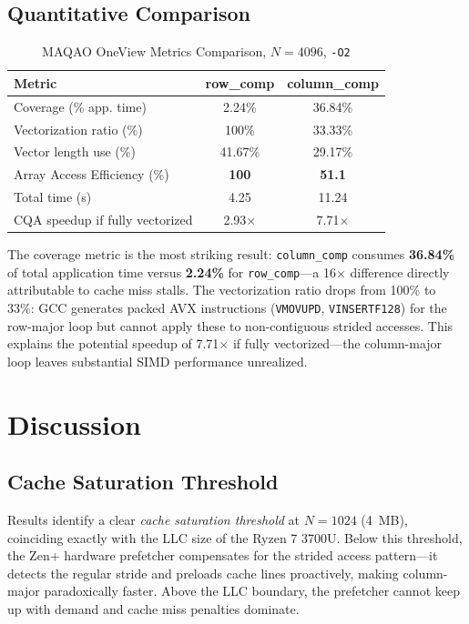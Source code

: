 \documentclass[conference]{IEEEtran}
\begin{document}
\subsection{Quantitative Comparison}

\begin{table}[H]
\caption{MAQAO OneView Metrics Comparison, $N = 4096$, \texttt{-O2}}
\label{tab:maqao}
\centering
\begin{tabular}{lcc}
\toprule
\textbf{Metric} & \textbf{row\_comp} & \textbf{column\_comp} \\
\midrule
Coverage (\% app. time)         & 2.24\%       & 36.84\%       \\
Vectorization ratio (\%)        & 100\%        & 33.33\%       \\
Vector length use (\%)          & 41.67\%      & 29.17\%       \\
Array Access Efficiency (\%)    & \textbf{100} & \textbf{51.1} \\
Total time (s)                  & 4.25         & 11.24         \\
CQA speedup if fully vectorized & 2.93$\times$ & 7.71$\times$  \\
\bottomrule
\end{tabular}
\end{table}

The coverage metric is the most striking result: \texttt{column\_comp} consumes
\textbf{36.84\%} of total application time versus \textbf{2.24\%} for
\texttt{row\_comp}---a 16$\times$ difference directly attributable to cache
miss stalls. The vectorization ratio drops from 100\% to 33\%: GCC generates
packed AVX instructions (\texttt{VMOVUPD}, \texttt{VINSERTF128}) for the
row-major loop but cannot apply these to non-contiguous strided accesses. This
explains the potential speedup of 7.71$\times$ if fully vectorized---the
column-major loop leaves substantial SIMD performance unrealized.

\section{Discussion}
\label{sec:discussion}

\subsection{Cache Saturation Threshold}

Results identify a clear \textit{cache saturation threshold} at $N = 1024$
(4~MB), coinciding exactly with the LLC size of the Ryzen 7 3700U. Below this
threshold, the Zen+ hardware prefetcher compensates for the strided access
pattern---it detects the regular stride and preloads cache lines proactively,
making column-major paradoxically faster. Above the LLC boundary, the prefetcher
cannot keep up with demand and cache miss penalties dominate.
\end{document}
